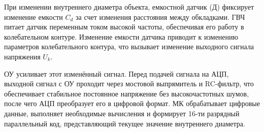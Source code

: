 


При изменении внутреннего диаметра объекта, емкостной датчик (Д) фиксирует изменение емкости \(C_d\) за счет изменения расстояния между обкладками. 
ГВЧ питает датчик переменным током высокой частоты, обеспечивая его работу в колебательном контуре. 
Изменение емкости датчика приводит к изменению параметров колебательного контура, что вызывает изменение выходного сигнала напряжения \(U_k\).

ОУ усиливает этот изменённый сигнал. Перед подачей сигнала на АЦП, выходной сигнал с ОУ проходит через мостовой выпрямитель и RC-фильтр, что обеспечивает стабильное постоянное напряжение без высокочастотных шумов, после чего АЦП преобразует его в цифровой формат. МК обрабатывает цифровые данные, выполняет необходимые вычисления и формирует 16-ти разрядный параллельный код, представляющий текущее значение внутреннего диаметра.
\endinput